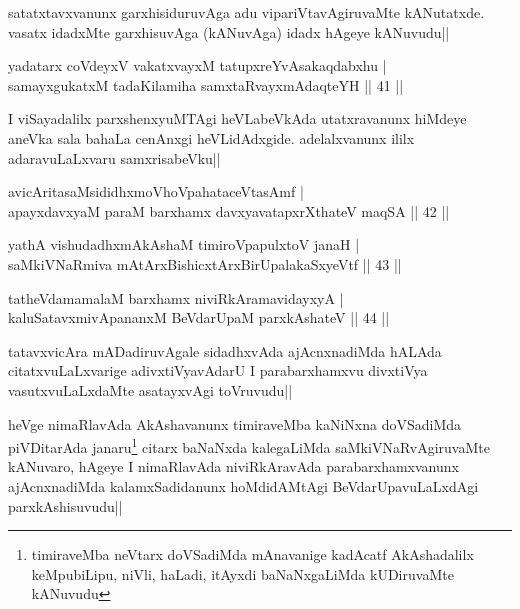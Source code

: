 \begin{artha}
satatxtavxvanunx garxhisiduruvAga adu vipariVtavAgiruvaMte kANutatxde.  vasatx idadxMte garxhisuvAga (kANuvAga) idadx hAgeye kANuvudu||
\end{artha}

\begin{shl}
yadatarx coVdeyxV vakatxvayxM tatupxreYvAsakaqdabxhu |\\
samayxgukatxM tadaKilamiha samxtaRvayxmAdaqteYH \hfill || 41 ||
\end{shl}

\begin{artha}
I viSayadalilx parxshenxyuMTAgi heVLabeVkAda utatxravanunx hiMdeye aneVka sala bahaLa cenAnxgi heVLidAdxgide. adelalxvanunx ililx adaravuLaLxvaru samxrisabeVku||
\end{artha}


\begin{shl}
avicAritasaMsididhxmoVhoVpahataceVtasAmf |\\
apayxdavxyaM paraM barxhamx davxyavatapxrXthateV maqSA \hfill || 42 ||
\end{shl}

\begin{shl}
yathA vishudadhxmAkAshaM timiroVpapulxtoV janaH |\\
saMkiVNaRmiva mAtArxBishicxtArxBirUpalakaSxyeVtf \hfill || 43 ||
\end{shl}

\begin{shl}
tatheVdamamalaM barxhamx niviRkAramavidayxyA |\\
kaluSatavxmivA\s \s pananxM BeVdarUpaM parxkAshateV \hfill || 44 ||
\end{shl}

\begin{artha}%
tatavxvicAra mADadiruvAgale sidadhxvAda ajAcnxnadiMda hALAda citatxvuLaLxvarige adivxtiVyavAdarU I parabarxhamxvu divxtiVya vasutxvuLaLxdaMte asatayxvAgi toVruvudu||

heVge nimaRlavAda AkAshavanunx timiraveMba kaNiNxna doVSadiMda piVDitarAda janaru\footnote[1]{timiraveMba neVtarx doVSadiMda mAnavanige kadAcatf AkAshadalilx keMpubiLipu, niVli, haLadi, itAyxdi baNaNxgaLiMda kUDiruvaMte kANuvudu} citarx baNaNxda kalegaLiMda saMkiVNaRvAgiruvaMte kANuvaro, hAgeye I nimaRlavAda niviRkAravAda parabarxhamxvanunx ajAcnxnadiMda kalamxSadidanunx hoMdidAMtAgi BeVdarUpavuLaLxdAgi parxkAshisuvudu||
\end{artha}

